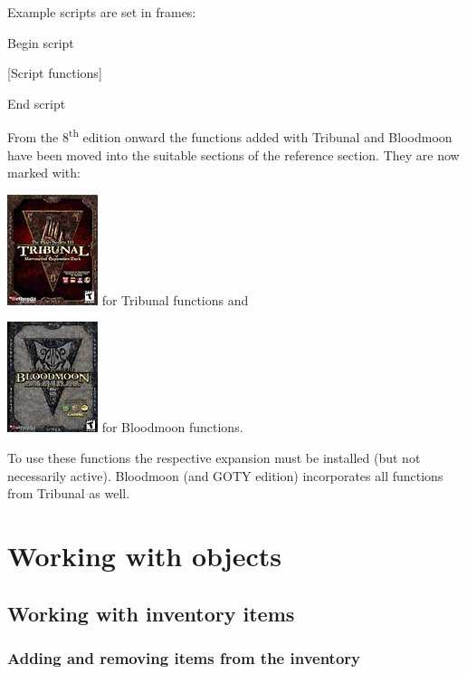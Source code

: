 \documentclass[
]{article}
\begin{document}
Example scripts are set in frames:

Begin script

{[}Script functions{]}

End script

From the 8\textsuperscript{th} edition onward the functions added with
Tribunal and Bloodmoon have been moved into the suitable sections of the
reference section. They are now marked with:

\includegraphics{media/image6.png} for Tribunal functions and

\includegraphics{media/image7.png} for Bloodmoon functions.

To use these functions the respective expansion must be installed (but
not necessarily active). Bloodmoon (and GOTY edition) incorporates all
functions from Tribunal as well.

\hypertarget{working-with-objects}{%
\section{\texorpdfstring{\hfill\break
Working with
objects}{ Working with objects}}\label{working-with-objects}}

\hypertarget{working-with-inventory-items}{%
\subsection{Working with inventory
items}\label{working-with-inventory-items}}

\hypertarget{adding-and-removing-items-from-the-inventory}{%
\subsubsection{Adding and removing items from the
inventory}\label{adding-and-removing-items-from-the-inventory}}
\end{document}
